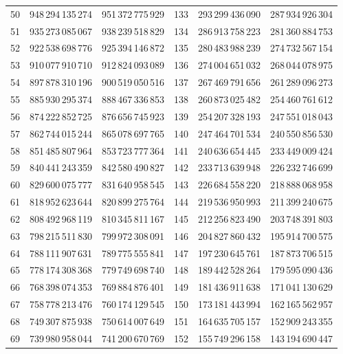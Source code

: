 \begin{longtable}{@{}r r r@{\qquad\qquad}r r r@{}}
50 & 948\,294\,135\,274 & 951\,372\,775\,929 & 133 & 293\,299\,436\,090 & 287\,934\,926\,304\\
51 & 935\,273\,085\,067 & 938\,239\,518\,829 & 134 & 286\,913\,758\,223 & 281\,360\,884\,753\\
52 & 922\,538\,698\,776 & 925\,394\,146\,872 & 135 & 280\,483\,988\,239 & 274\,732\,567\,154\\
53 & 910\,077\,910\,710 & 912\,824\,093\,089 & 136 & 274\,004\,651\,032 & 268\,044\,078\,975\\
54 & 897\,878\,310\,196 & 900\,519\,050\,516 & 137 & 267\,469\,791\,656 & 261\,289\,096\,273\\
55 & 885\,930\,295\,374 & 888\,467\,336\,853 & 138 & 260\,873\,025\,482 & 254\,460\,761\,612\\
56 & 874\,222\,852\,725 & 876\,656\,745\,923 & 139 & 254\,207\,328\,193 & 247\,551\,018\,043\\
57 & 862\,744\,015\,244 & 865\,078\,697\,765 & 140 & 247\,464\,701\,534 & 240\,550\,856\,530\\
58 & 851\,485\,807\,964 & 853\,723\,777\,364 & 141 & 240\,636\,654\,445 & 233\,449\,009\,424\\
59 & 840\,441\,243\,359 & 842\,580\,490\,827 & 142 & 233\,713\,639\,948 & 226\,232\,746\,699\\
60 & 829\,600\,075\,777 & 831\,640\,958\,545 & 143 & 226\,684\,558\,220 & 218\,888\,068\,958\\
61 & 818\,952\,623\,644 & 820\,899\,275\,764 & 144 & 219\,536\,950\,993 & 211\,399\,240\,675\\
62 & 808\,492\,968\,119 & 810\,345\,811\,167 & 145 & 212\,256\,823\,490 & 203\,748\,391\,803\\
63 & 798\,215\,511\,830 & 799\,972\,308\,091 & 146 & 204\,827\,860\,432 & 195\,914\,700\,575\\
64 & 788\,111\,907\,631 & 789\,775\,555\,841 & 147 & 197\,230\,645\,761 & 187\,873\,706\,515\\
65 & 778\,174\,308\,368 & 779\,749\,698\,740 & 148 & 189\,442\,528\,264 & 179\,595\,090\,436\\
66 & 768\,398\,074\,353 & 769\,884\,876\,401 & 149 & 181\,436\,911\,638 & 171\,041\,130\,629\\
67 & 758\,778\,213\,476 & 760\,174\,129\,545 & 150 & 173\,181\,443\,994 & 162\,165\,562\,957\\
68 & 749\,307\,875\,938 & 750\,614\,007\,649 & 151 & 164\,635\,705\,157 & 152\,909\,243\,355\\
69 & 739\,980\,958\,044 & 741\,200\,670\,769 & 152 & 155\,749\,296\,158 & 143\,194\,690\,447\\

\end{longtable}
